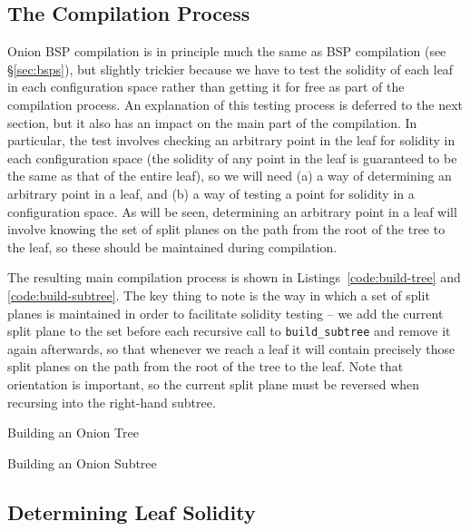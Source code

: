 \documentclass[10pt,twocolumn]{article}
\begin{document}
\subsection{The Compilation Process}

Onion BSP compilation is in principle much the same as BSP compilation (see \S\ref{sec:bsps}), but slightly trickier because we have to test the solidity of each leaf in each configuration space rather than getting it for free as part of the compilation process. An explanation of this testing process is deferred to the next section, but it also has an impact on the main part of the compilation. In particular, the test involves checking an arbitrary point in the leaf for solidity in each configuration space (the solidity of any point in the leaf is guaranteed to be the same as that of the entire leaf), so we will need (a) a way of determining an arbitrary point in a leaf, and (b) a way of testing a point for solidity in a configuration space. As will be seen, determining an arbitrary point in a leaf will involve knowing the set of split planes on the path from the root of the tree to the leaf, so these should be maintained during compilation.

The resulting main compilation process is shown in Listings~\ref{code:build-tree} and \ref{code:build-subtree}. The key thing to note is the way in which a set of split planes is maintained in order to facilitate solidity testing -- we add the current split plane to the set before each recursive call to \texttt{build\_subtree} and remove it again afterwards, so that whenever we reach a leaf it will contain precisely those split planes on the path from the root of the tree to the leaf. Note that orientation is important, so the current split plane must be reversed when recursing into the right-hand subtree.

\begin{stulisting}[!t]
\caption{Building an Onion Tree}
\label{code:build-tree}

\end{stulisting}

\begin{stulisting}[tp]
\caption{Building an Onion Subtree}
\label{code:build-subtree}

\end{stulisting}

\subsection{Determining Leaf Solidity}
\end{document}
